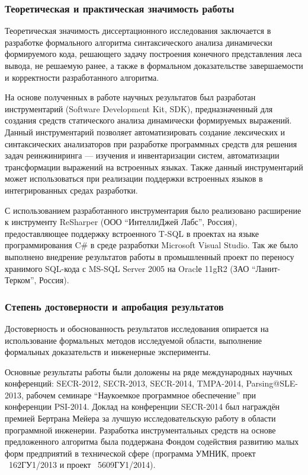 \subsubsection*{\large{Теоретическая и практическая значимость работы}}

Теоретическая значимость диссертационного исследования заключается в разработке формального алгоритма синтаксического анализа динамически формируемого кода, решающего задачу построения конечного представления леса вывода, не решаемую ранее, а также в формальном доказательстве завершаемости и корректности разработанного алгоритма. 

На основе полученных в работе научных результатов был разработан инструментарий (Software Development Kit, SDK), предназначенный для создания средств статического анализа динамически формируемых выражений. Данный инструментарий позволяет автоматизировать создание лексических и синтаксических анализаторов при разработке программных средств для решения задач реинжиниринга --- изучения и инвентаризации систем, автоматизации трансформации выражений на встроенных языках. Также данный инструментарий может использоваться при реализации поддержки встроенных языков в интегрированных средах разработки.

С использованием разработанного инструментария было реализовано расширение к инструменту ReSharper (ООО ``ИнтеллиДжей Лабс'', Россия), предоставляющее поддержку встроенного T-SQL в проектах на языке программирования C\# в среде разработки Microsoft Visual Studio. Так же было выполнено внедрение результатов работы в промышленный проект по переносу хранимого SQL-кода с MS-SQL Server 2005 на Oraclе 11gR2 (ЗАО ``Ланит-Терком'', Россия). 


\subsubsection*{\large{Степень достоверности и апробация результатов}}

Достоверность и обоснованность результатов исследования опирается на использование формальных методов исследуемой области, выполнение формальных доказательств и инженерные эксперименты.

Основные результаты работы были доложены на ряде международных научных конференций: SECR-2012, SECR-2013, SECR-2014, TMPA-2014, Parsing@SLE-2013, рабочем семинаре ``Наукоемкое программное обеспечение'' при конференции PSI-2014. Доклад на конференции SECR-2014 был награждён премией Бертрана Мейера за лучшую исследовательскую работу в области программной инженерии. Разработка инструментальных средств на основе предложенного алгоритма была поддержана Фондом содействия развитию малых форм предприятий в технической сфере (программа УМНИК, проект \textnumero~162ГУ1/2013 и проект \textnumero~5609ГУ1/2014).

